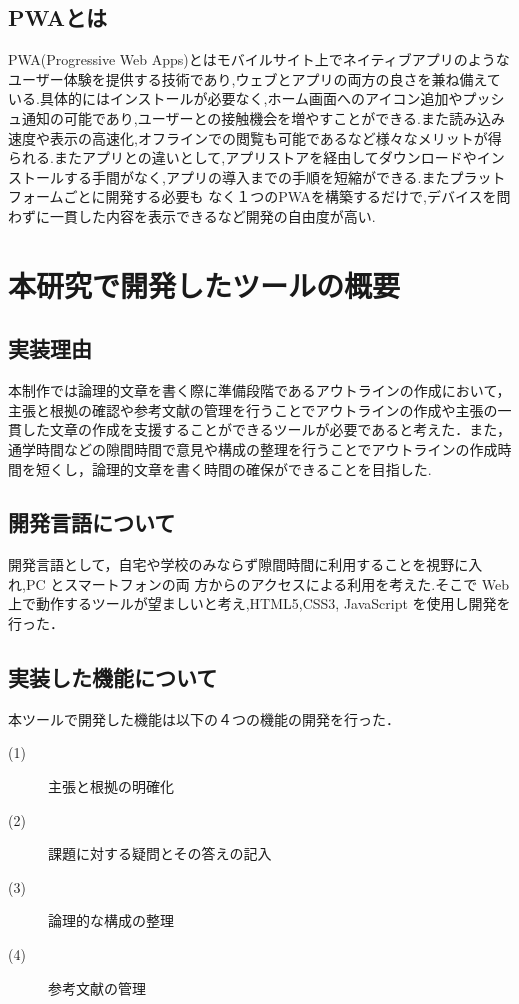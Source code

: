 \documentclass[a4j,12pt]{jarticle}
\begin{document}
\subsection{PWAとは}
PWA(Progressive Web Apps)とはモバイルサイト上でネイティブアプリのようなユーザー体験を提供する技術であり,ウェブとアプリの両方の良さを兼ね備えている.具体的にはインストールが必要なく,ホーム画面へのアイコン追加やプッシュ通知の可能であり,ユーザーとの接触機会を増やすことができる.また読み込み速度や表示の高速化,オフラインでの閲覧も可能であるなど様々なメリットが得られる.またアプリとの違いとして,アプリストアを経由してダウンロードやインストールする手間がなく,アプリの導入までの手順を短縮ができる.またプラットフォームごとに開発する必要も
なく１つのPWAを構築するだけで,デバイスを問わずに一貫した内容を表示できるなど開発の自由度が高い.
\newpage
\section{本研究で開発したツールの概要}
\subsection{実装理由}
本制作では論理的文章を書く際に準備段階であるアウトラインの作成において，主張と根拠の確認や参考文献の管理を行うことでアウトラインの作成や主張の一貫した文章の作成を支援することができるツールが必要であると考えた．また，通学時間などの隙間時間で意見や構成の整理を行うことでアウトラインの作成時間を短くし，論理的文章を書く時間の確保ができることを目指した.

\subsection{開発言語について}
開発言語として，自宅や学校のみならず隙間時間に利用することを視野に入れ,PC とスマートフォンの両
方からのアクセスによる利用を考えた.そこで Web 上で動作するツールが望ましいと考え,HTML5,CSS3, JavaScript を使用し開発を行った．
\subsection{実装した機能について}
本ツールで開発した機能は以下の４つの機能の開発を行った．
\begin{description}
  \item[(1)] 主張と根拠の明確化
  \item[(2)] 課題に対する疑問とその答えの記入
  \item[(3)] 論理的な構成の整理
  \item[(4)] 参考文献の管理
 \end{description}
\end{document}

